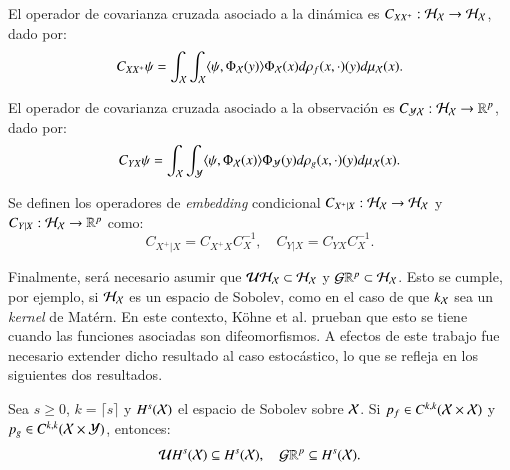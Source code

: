 \begin{defn}
    El operador de covarianza cruzada asociado a la dinámica es $C_{X X^+} : \mathcal{H}_{\mathcal{X}} \to \mathcal{H}_{\mathcal{X}}$, dado por:
	\begin{equation*}
		C_{X X^+} \psi = \int_{\mathcal{X}} \int_{\mathcal{X}} \langle \psi, \Phi_{\mathcal{X}} (y) \rangle \Phi_{\mathcal{X}} (x) d\rho_f (x, \cdot)(y) d \mu_{\mathcal{X}} (x).
	\end{equation*}
    
    El operador de covarianza cruzada asociado a la observación es $C_{\mathcal{Y} \mathcal{X}} : \mathcal{H}_{\mathcal{X}} \to \mathbb{R}^p$, dado por:
	\begin{equation*}
		C_{Y X} \psi = \int_{\mathcal{X}} \int_{\mathcal{Y}} \langle \psi, \Phi_{\mathcal{X}} (x) \rangle \Phi_{\mathcal{Y}} (y) d\rho_g (x, \cdot)(y) d \mu_{\mathcal{X}} (x).
	\end{equation*}
\end{defn}

\begin{defn}   
    Se definen los operadores de \textit{embedding} condicional $C_{X^+ | X} : \mathcal{H}_{\mathcal{X}} \to \mathcal{H}_{\mathcal{X}}$ y $C_{Y | X} : \mathcal{H}_{\mathcal{X}} \to \mathbb{R}^p$ como:
	\begin{equation*}
		C_{X^+ | X} = C_{X^+ X} C_X^{-1}, \quad C_{Y | X} = C_{Y X} C_X^{-1}.
	\end{equation*}
\end{defn}

Finalmente, será necesario asumir que $\mathcal{U} \mathcal{H}_{\mathcal{X}} \subset \mathcal{H}_{\mathcal{X}}$ y $\mathcal{G} \mathbb{R}^p \subset \mathcal{H}_{\mathcal{X}}$. Esto se cumple, por ejemplo, si $\mathcal{H}_{\mathcal{X}}$ es un espacio de Sobolev, como en el caso de que $k_{\mathcal{X}}$ sea un \textit{kernel} de Matérn. En este contexto, Köhne et al. \cite{Kohne2024L-errorDecomposition} prueban que esto se tiene cuando las funciones asociadas son difeomorfismos. A efectos de este trabajo fue necesario extender dicho resultado al caso estocástico, lo que se refleja en los siguientes dos resultados.

\begin{prop}
	Sea $s \geq 0$, $k =\lceil s \rceil $ y $H^s(\mathcal{X})$ el espacio de Sobolev sobre $\mathcal{X}$. Si $p_f \in C^{k,k} (\mathcal{X} \times \mathcal{X})$ y $p_g \in C^{k,k} (\mathcal{X} \times \mathcal{Y})$, entonces:
	\begin{equation*}
		\mathcal{U} H^s (\mathcal{X}) \subseteq H^s (\mathcal{X}), \quad \mathcal{G} \mathbb{R}^p \subseteq H^s (\mathcal{X}).
	\end{equation*}
\end{prop}

